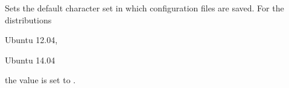 
Sets the default character set  in which configuration files are 
saved. For the distributions
\begin{inparaitem}
\item[\TheDistribution{ubuntu}] Ubuntu 12.04,
\item[\TheDistribution{ubuntu}] Ubuntu 14.04
\end{inparaitem}
the value is set to .
